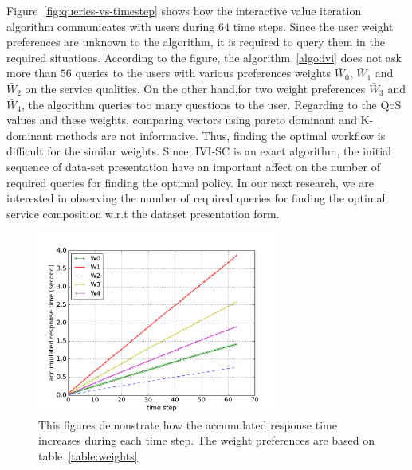 \documentclass[10pt,journal,compsoc]{IEEEtran}
\newcommand{\red}[1]{\textcolor{red}{#1}}
\begin{document}
Figure~\ref{fig:queries-vs-timestep} shows how the interactive value iteration algorithm communicates with users during $64$ time steps. Since the user weight preferences are unknown to the algorithm, it is required to query them in the required situations. According to the figure, the algorithm~\ref{algo:ivi} does not ask more than $56$ queries to the users with various preferences weights $\bar{W}_0$, $\bar{W}_1$ and $\bar{W}_2$ on the service qualities. On the other hand,for two weight preferences $\bar{W}_3$ and $\bar{W}_4$, the algorithm queries too many questions to the user. Regarding to the QoS values and these weights, comparing vectors using pareto dominant and K-dominant methods are not informative. Thus, finding the optimal workflow is difficult for the similar weights. Since, IVI-SC is an exact algorithm, the initial sequence of data-set presentation have an important affect on the number of required queries for finding the optimal policy. In our next research, we are interested in observing the number of required queries for finding the optimal service composition w.r.t the dataset presentation form. 

\begin{figure}[t]
\includegraphics[width=8cm]{new_graphs/rt_step_all++.pdf}
\caption{This figures demonstrate how the accumulated response time increases during each time step. The weight preferences are based on table~\ref{table:weights}.} 
\centering
\label{fig:rt-vs-timestep}
\end{figure}
\end{document}
